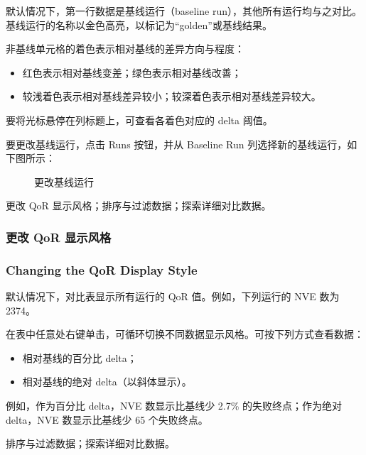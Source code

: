 默认情况下，第一行数据是基线运行（baseline run），其他所有运行均与之对比。基线运行的名称以金色高亮，以标记为“golden”或基线结果。

非基线单元格的着色表示相对基线的差异方向与程度：
\begin{itemize}
  \item 红色表示相对基线变差；绿色表示相对基线改善；
  \item 较浅着色表示相对基线差异较小；较深着色表示相对基线差异较大。
\end{itemize}

要将光标悬停在列标题上，可查看各着色对应的 delta 阈值。

要更改基线运行，点击 Runs 按钮，并从 Baseline Run 列选择新的基线运行，如下图所示：

\begin{figure}[htbp]
\centering
{}
\caption{更改基线运行}
\label{fig:baseline-run}
\end{figure}

\begin{seeAlsoBox}
更改 QoR 显示风格；排序与过滤数据；探索详细对比数据。
\end{seeAlsoBox}

\subsubsection{更改 QoR 显示风格}
\subsubsection*{Changing the QoR Display Style}

默认情况下，对比表显示所有运行的 QoR 值。例如，下列运行的 NVE 数为 2374。

在表中任意处右键单击，可循环切换不同数据显示风格。可按下列方式查看数据：
\begin{itemize}
  \item 相对基线的百分比 delta；
  \item 相对基线的绝对 delta（以斜体显示）。
\end{itemize}

例如，作为百分比 delta，NVE 数显示比基线少 2.7\% 的失败终点；作为绝对 delta，NVE 数显示比基线少 65 个失败终点。

\begin{seeAlsoBox}
排序与过滤数据；探索详细对比数据。
\end{seeAlsoBox}

